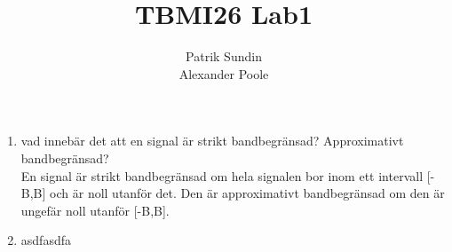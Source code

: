 \documentclass[a4paper,12pt]{article}
\title{TBMI26 Lab1}
\author{Patrik Sundin \\Alexander Poole\\}
\begin{document}
\maketitle
	\thispagestyle{empty}
\newpage

\begin{enumerate}

  \item vad innebär det att en signal är strikt bandbegränsad? Approximativt bandbegränsad? \hfill \\
    En signal är strikt bandbegränsad om hela signalen bor inom ett intervall [-B,B] och är noll utanför det. Den är approximativt bandbegränsad om den är ungefär noll utanför [-B,B].

\item asdfasdfa

\end{enumerate}
\end{document}
